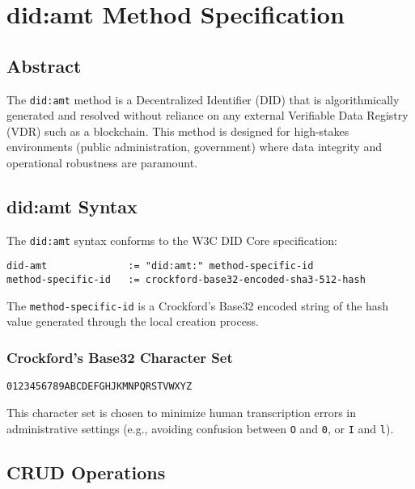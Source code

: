 \chapter{did:amt Method Specification}

\section{Abstract}

\begin{definition}
  \label{def:did-amt}
  The \texttt{did:amt} method is a Decentralized Identifier (DID) that is algorithmically generated
  and resolved without reliance on any external Verifiable Data Registry (VDR) such as a blockchain.
  This method is designed for high-stakes environments (public administration, government) where
  data integrity and operational robustness are paramount.
  \leanok
\end{definition}

\section{did:amt Syntax}

The \texttt{did:amt} syntax conforms to the W3C DID Core specification:

\begin{verbatim}
did-amt              := "did:amt:" method-specific-id
method-specific-id   := crockford-base32-encoded-sha3-512-hash
\end{verbatim}

The \texttt{method-specific-id} is a Crockford's Base32 encoded string of the hash value generated through the local creation process.

\subsection{Crockford's Base32 Character Set}

\texttt{0123456789ABCDEFGHJKMNPQRSTVWXYZ}

This character set is chosen to minimize human transcription errors in administrative settings (e.g., avoiding confusion between \texttt{O} and \texttt{0}, or \texttt{I} and \texttt{l}).

\section{CRUD Operations}

